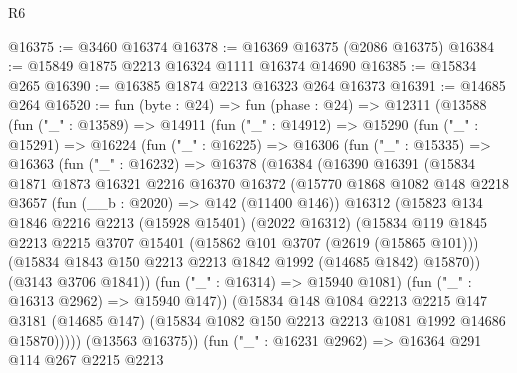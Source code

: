 \begin{lexlean}{R6}
\begin{coremodule}
@16375 := @3460 @16374
@16378 := @16369 @16375 (@2086 @16375)
@16384 := @15849 @1875 @2213 @16324 @1111 @16374 @14690
@16385 := @15834 @265
@16390 := @16385 @1874 @2213 @16323 @264 @16373
@16391 := @14685 @264
@16520 := fun (byte : @24) =>
  fun (phase : @24) =>
  @12311
    (@13588
      (fun ("_" : @13589) =>
      @14911
        (fun ("_" : @14912) =>
        @15290
          (fun ("_" : @15291) =>
          @16224
            (fun ("_" : @16225) =>
            @16306
              (fun ("_" : @15335) =>
              @16363
                (fun ("_" : @16232) =>
                @16378
                  (@16384
                    (@16390
                      @16391
                      (@15834
                        @1871
                        @1873
                        @16321
                        @2216
                        @16370
                        @16372
                        (@15770
                          @1868
                          @1082
                          @148
                          @2218
                          @3657
                          (fun (__b : @2020) => @142 (@11400 @146))
                          @16312
                          (@15823
                            @134
                            @1846
                            @2216
                            @2213
                            (@15928 @15401)
                            (@2022 @16312)
                            (@15834
                              @119
                              @1845
                              @2213
                              @2215
                              @3707
                              @15401
                              (@15862 @101 @3707 (@2619 (@15865 @101)))
                              (@15834 @1843 @150 @2213 @2213 @1842 @1992 (@14685 @1842) @15870))
                            (@3143 @3706 @1841))
                          (fun ("_" : @16314) => @15940 @1081)
                          (fun ("_" : @16313 @2962) => @15940 @147))
                        (@15834
                          @148
                          @1084
                          @2213
                          @2215
                          @147
                          @3181
                          (@14685 @147)
                          (@15834 @1082 @150 @2213 @2213 @1081 @1992 @14686 @15870)))))
                  (@13563 @16375))
                (fun ("_" : @16231 @2962) =>
                @16364
                  @291
                  @114
                  @267
                  @2215
                  @2213

\end{coremodule}
\end{lexlean}
